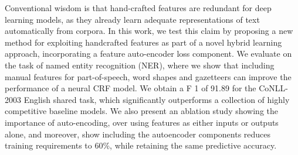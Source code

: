 Conventional wisdom is that hand-crafted features are redundant for deep learning models, as they already learn adequate representations of text automatically from corpora. In this work, we test this claim by proposing a new method for exploiting handcrafted features as part of a novel hybrid learning approach, incorporating a feature auto-encoder loss component. We evaluate on the task of named entity recognition (NER), where we show that including manual features for part-of-speech, word shapes and gazetteers can improve the performance of a neural CRF model. We obtain a F 1 of 91.89 for the CoNLL-2003 English shared task, which significantly outperforms a collection of highly competitive baseline models. We also present an ablation study showing the importance of auto-encoding, over using features as either inputs or outputs alone, and moreover, show including the autoencoder components reduces training requirements to 60\%, while retaining the same predictive accuracy.
